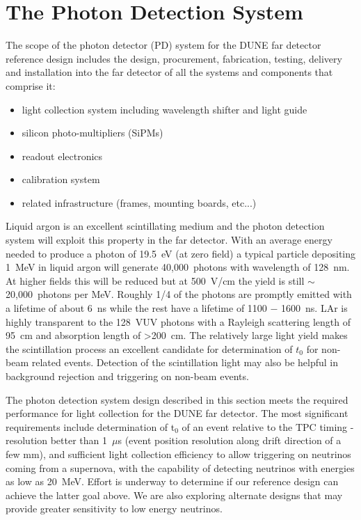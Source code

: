 \section{The Photon Detection System}
\label{sec:detectors-fd-ref-pd}

The scope of the photon detector (PD) system for the DUNE far detector
reference design includes the design, procurement, fabrication,
testing, delivery and installation into the far detector of all the
systems and components that comprise it:

\begin{itemize}
\item light collection system including wavelength shifter and light guide
\item silicon photo-multipliers (SiPMs)
\item readout electronics
\item calibration system
\item related infrastructure (frames, mounting boards, etc...)
\end{itemize}

Liquid argon is an excellent scintillating medium and the photon
detection system will exploit this property in the far detector.  With
an average energy needed to produce a photon of 19.5~eV (at zero
field) a typical particle depositing 1~MeV in liquid argon will
generate 40,000~photons with wavelength of 128~nm. At higher fields
this will be reduced but at 500~V/cm the yield is still
$\sim$20,000~photons per MeV. Roughly 1/4 of the photons are promptly
emitted with a lifetime of about 6~ns while the rest have a lifetime
of 1100 $-$ 1600~ns. LAr is highly transparent to the 128~VUV photons
with a Rayleigh scattering length of 95~cm and absorption length of
>200~cm.  The relatively large light yield makes the scintillation
process an excellent candidate for determination of $t_{0}$ for
non-beam related events. Detection of the scintillation light may also
be helpful in background rejection and triggering on non-beam events.

The photon detection system design described in this section meets the
required performance for light collection for the DUNE far
detector. The most significant requirements include determination of
t$_0$ of an event relative to the TPC timing - resolution better than
1~$\mu$s (event position resolution along drift direction of a few
mm), and sufficient light collection efficiency to allow triggering on
neutrinos coming from a supernova, with the capability of detecting
neutrinos with energies as low as 20~MeV. Effort is underway to
determine if our reference design can achieve the latter goal
above. We are also exploring alternate designs that may provide
greater sensitivity to low energy neutrinos.


